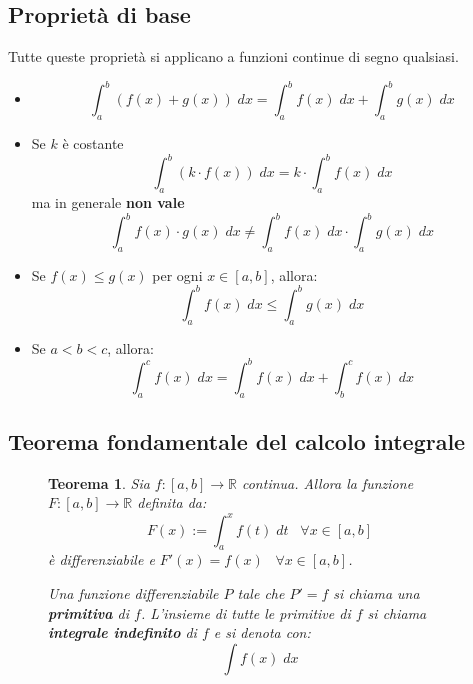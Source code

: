 \documentclass[a4paper]{article}
\newtheorem{theorem}{Teorema}
\theoremstyle{break}
\theoremstyle{break}
\theoremstyle{break}
\theoremstyle{break}
\begin{document}
\subsection{Proprietà di base}
Tutte queste proprietà si applicano a funzioni continue di segno qualsiasi.
\begin{itemize}
  \item \[
      \int_{a}^{b} (f(x) + g(x)) \; dx = \int_{a}^{b} f(x)\;dx + \int_{a}^{b} g(x)\;dx
    \] 
  \item Se \( k \) è costante
    \[
      \int_{a}^{b} (k \cdot f(x))\;dx = k \cdot \int_{a}^{b} f(x)\;dx
    \] 
    ma in generale \textbf{non vale}
    \[
      \int_{a}^{b} f(x) \cdot g(x) \; dx \neq \int_{a}^{b} f(x)\;dx \cdot \int_{a}^{b} g(x)\;dx
    \] 
  \item Se \( f(x) \le g(x) \) per ogni \( x \in [a,b] \), allora:
    \[
      \int_{a}^{b} f(x)\;dx \le \int_{a}^{b} g(x)\;dx
    \] 
  \item Se \( a < b < c \), allora:
    \[
      \int_{a}^{c} f(x)\; dx = \int_{a}^{b} f(x)\;dx + \int_{b}^{c} f(x)\;dx
    \] 
\end{itemize}

\subsection{Teorema fondamentale del calcolo integrale}
\begin{figure}[H]
  \begin{theorem}
    Sia \( f: [a,b] \to \mathbb{R} \) continua. Allora la funzione \( F: [a,b] \to \mathbb{R} \) definita da:
    \[
      F(x):= \int_{a}^{x} f(t)\;dt \;\;\; \forall x \in [a,b]
    \] 
    è differenziabile e \( F'(x) = f(x) \;\;\; \forall x \in [a,b] \).

    Una funzione differenziabile \( P \) tale che \( P'=f \) si chiama una \textbf{primitiva} di \( f \).
    L'insieme di tutte le primitive di \( f \) si chiama \textbf{integrale indefinito} di \( f \) e
    si denota con:
    \[
      \int f(x)\;dx
    \] 
  \end{theorem}
\end{figure}
\end{document}

